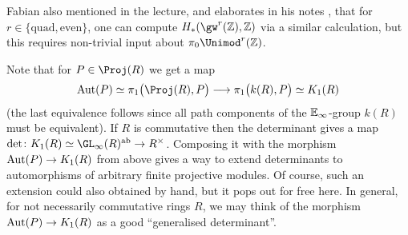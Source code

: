 Fabian also mentioned in the lecture, and elaborates in his notes \cite[Chapter~III pp.--49]{KTheory}, that for $r\in\{\mathrm{quad},\mathrm{even}\}$, one can compute $H_*(\gw^r(\IZ),\IZ)$ via a similar calculation, but this requires non-trivial input about $\pi_0\Unimod^r(\IZ)$.

Note that for $P\in\Proj(R)$ we get a map 
\begin{equation*}
	\Aut(P)\simeq \pi_1\big(\Proj(R),P\big)\morphism\pi_1\big(k(R),P\big)\simeq K_1(R)
\end{equation*}
(the last equivalence follows since all path components of the $\mathbb{E}_\infty$-group $k(R)$ must be equivalent). If $R$ is commutative then the determinant gives a map $\det\colon K_1(R)\simeq \GL_\infty(R)^\ab\morphism R^\times$. Composing it with the morphism $\Aut(P)\morphism K_1(R)$ from above gives a way to extend determinants to automorphisms of arbitrary finite projective modules. Of course, such an extension could also obtained by hand, but it pops out for free here. In general, for not necessarily commutative rings $R$, we may think of the morphism $\Aut(P)\morphism K_1(R)$ as a good \enquote{generalised determinant}.

